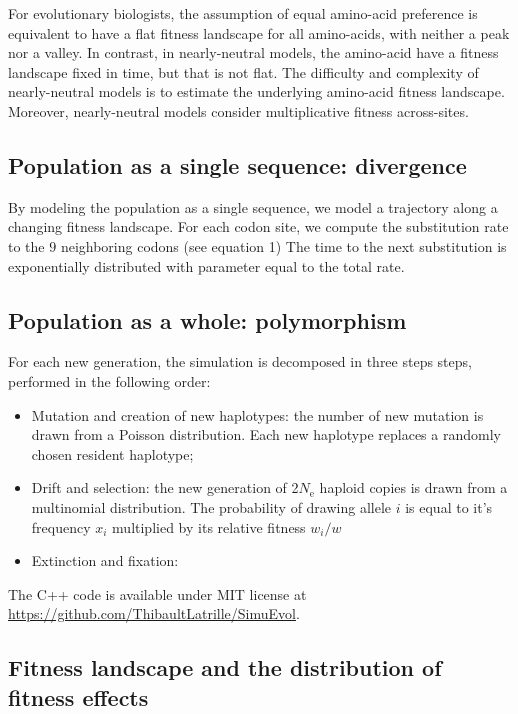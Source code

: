 \documentclass{article}
\newcommand{\e}{\mathrm{e}}
\newcommand{\Ne}{N_\e}
\begin{document}
For evolutionary biologists, the assumption of equal amino-acid preference is equivalent to have a flat fitness landscape for all amino-acids, with neither a peak nor a valley.
In contrast, in nearly-neutral models, the amino-acid have a fitness landscape fixed in time, but that is not flat.
The difficulty and complexity of nearly-neutral models is to estimate the underlying amino-acid fitness landscape.
Moreover, nearly-neutral models consider multiplicative fitness across-sites.

\subsection{Population as a single sequence: divergence}

By modeling the population as a single sequence, we model a trajectory along a changing fitness landscape.
For each codon site, we compute the substitution rate to the $9$ neighboring codons (see equation 1)  
The time to the next substitution is exponentially distributed with parameter equal to the total rate.



\subsection{Population as a whole: polymorphism}

For each new generation, the simulation is decomposed in three steps
steps, performed in the following order:
\begin{itemize}
	\setlength\itemsep{-0.25em}
	\item  Mutation and creation of new haplotypes: the number of new mutation is drawn from a
	Poisson distribution. Each new haplotype replaces a randomly chosen resident
	haplotype;
	\item Drift and selection: the new generation of 2$\Ne$ haploid copies is drawn from a multinomial
	distribution. The probability of drawing allele $i$ is equal to it’s frequency $x_i$ multiplied by
	its relative fitness $w_i / w$
	\item Extinction and fixation: 
\end{itemize}

The C++ code is available under MIT license at \url{https://github.com/ThibaultLatrille/SimuEvol}.

\subsection{Fitness landscape and the distribution of fitness effects}
\end{document}
